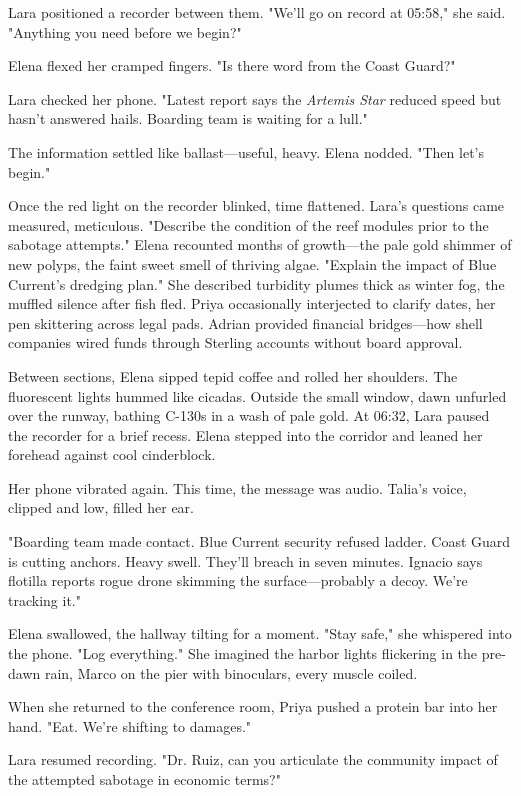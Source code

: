 Lara positioned a recorder between them. "We'll go on record at 05:58," she said. "Anything you need before we begin?"

Elena flexed her cramped fingers. "Is there word from the Coast Guard?"

Lara checked her phone. "Latest report says the \textit{Artemis Star} reduced speed but hasn't answered hails. Boarding team is waiting for a lull."

The information settled like ballast—useful, heavy. Elena nodded. "Then let's begin."

\bigskip

Once the red light on the recorder blinked, time flattened. Lara's questions came measured, meticulous. "Describe the condition of the reef modules prior to the sabotage attempts." Elena recounted months of growth—the pale gold shimmer of new polyps, the faint sweet smell of thriving algae. "Explain the impact of Blue Current's dredging plan." She described turbidity plumes thick as winter fog, the muffled silence after fish fled. Priya occasionally interjected to clarify dates, her pen skittering across legal pads. Adrian provided financial bridges—how shell companies wired funds through Sterling accounts without board approval.

Between sections, Elena sipped tepid coffee and rolled her shoulders. The fluorescent lights hummed like cicadas. Outside the small window, dawn unfurled over the runway, bathing C-130s in a wash of pale gold. At 06:32, Lara paused the recorder for a brief recess. Elena stepped into the corridor and leaned her forehead against cool cinderblock.

Her phone vibrated again. This time, the message was audio. Talia's voice, clipped and low, filled her ear.

"Boarding team made contact. Blue Current security refused ladder. Coast Guard is cutting anchors. Heavy swell. They'll breach in seven minutes. Ignacio says flotilla reports rogue drone skimming the surface—probably a decoy. We're tracking it."

Elena swallowed, the hallway tilting for a moment. "Stay safe," she whispered into the phone. "Log everything." She imagined the harbor lights flickering in the pre-dawn rain, Marco on the pier with binoculars, every muscle coiled.

When she returned to the conference room, Priya pushed a protein bar into her hand. "Eat. We're shifting to damages."

Lara resumed recording. "Dr. Ruiz, can you articulate the community impact of the attempted sabotage in economic terms?"

